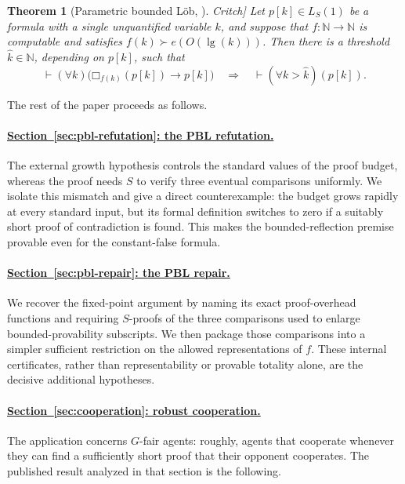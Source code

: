 \documentclass[11pt]{article}
\newtheorem*{critchtheorem}{Theorem}
\theoremstyle{definition}
\theoremstyle{remark}
\newcommand{\N}{\mathbb{N}}
\newcommand{\Boxb}[1]{\mathord{\Box}_{#1}}
\newcommand{\CritchPBLRef}{\cite[Theorem~4.2]{Critch}}
\begin{document}
\begin{critchtheorem}[Parametric bounded L\"ob, \CritchPBLRef]
Let $p[k]\in L_S(1)$ be a formula with a single unquantified variable $k$, and suppose that $f:\N\to\N$ is computable and satisfies $f(k)\succ e(O(\lg(k)))$. Then there is a threshold $\widehat{k}\in\N$, depending on $p[k]$, such that
\[
  \vdash (\forall k)\bigl(\Boxb{f(k)}(p[k])\to p[k]\bigr)
  \quad\Longrightarrow\quad
  \vdash (\forall k>\widehat{k})(p[k]).
\]
\end{critchtheorem}

The rest of the paper proceeds as follows.

\paragraph{\hyperref[sec:pbl-refutation]{Section~\ref*{sec:pbl-refutation}: the PBL refutation.}}
The external growth hypothesis controls the standard values of the proof budget, whereas the proof needs $S$ to verify three eventual comparisons uniformly.  We isolate this mismatch and give a direct counterexample: the budget grows rapidly at every standard input, but its formal definition switches to zero if a suitably short proof of contradiction is found.  This makes the bounded-reflection premise provable even for the constant-false formula.

\paragraph{\hyperref[sec:pbl-repair]{Section~\ref*{sec:pbl-repair}: the PBL repair.}}
We recover the fixed-point argument by naming its exact proof-overhead functions and requiring $S$-proofs of the three comparisons used to enlarge bounded-provability subscripts.  We then package those comparisons into a simpler sufficient restriction on the allowed representations of $f$.  These internal certificates, rather than representability or provable totality alone, are the decisive additional hypotheses.

\paragraph{\hyperref[sec:cooperation]{Section~\ref*{sec:cooperation}: robust cooperation.}}
The application concerns $G$-fair agents: roughly, agents that cooperate whenever they can find a sufficiently short proof that their opponent cooperates.  The published result analyzed in that section is the following.
\end{document}
